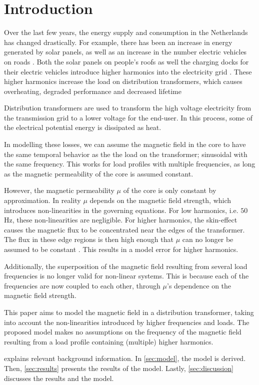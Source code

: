 \chapter{Introduction}

Over the last few years, the energy supply and consumption in the Netherlands has changed drastically. For example, there has been an increase in energy generated by solar panels, as well as an increase in the number electric vehicles on roads \citehere. 
Both the solar panels on people's roofs as well the charging docks for their electric vehicles introduce higher harmonics into the electricity grid \citehere.
These higher harmonics increase the load on distribution transformers, which causes overheating, degraded performance and decreased lifetime \cite{vanDijk2022}

Distribution transformers are used to transform the high voltage electricity from the transmission grid to a lower voltage for the end-user.
In this process, some of the electrical potential energy is dissipated as heat. 

In modelling these losses, we can assume the magnetic field in the core to have the same temporal behavior as the the load on the transformer; sinusoidal with the same frequency. \citehere 
This works for load profiles with multiple frequencies, as long as the magnetic permeability of the core is assumed constant.

However, the magnetic permeability $\mu$ of the core is only constant by approximation. In reality $\mu$ depends on the magnetic field strength, which introduces non-linearities in the governing equations.
For low harmonics, i.e. $50$ Hz, these non-linearities are negligible.
For higher harmonics, the skin-effect causes the magnetic flux to be concentrated near the edges of the transformer. 
The flux in these edge regions is then high enough that $\mu$ can no longer be assumed to be constant \citehere. 
This results in a model error for higher harmonics.

Additionally, the superposition of the magnetic field resulting from several load frequencies is no longer valid for non-linear systems.
This is because each of the frequencies are now coupled to each other, through $\mu$'s dependence on the magnetic field strength.

This paper aims to model the magnetic field in a distribution transformer, taking into account the non-linearities introduced by higher frequencies and loads.
The proposed model makes no assumptions on the frequency of the magnetic field resulting from a load profile containing (multiple) higher harmonics.

 explains relevant background information. 
In \cref{sec:model}, the model is derived. 
Then, \cref{sec:results} presents the results of the model. 
Lastly, \cref{sec:discussion} discusses the results and the model.


